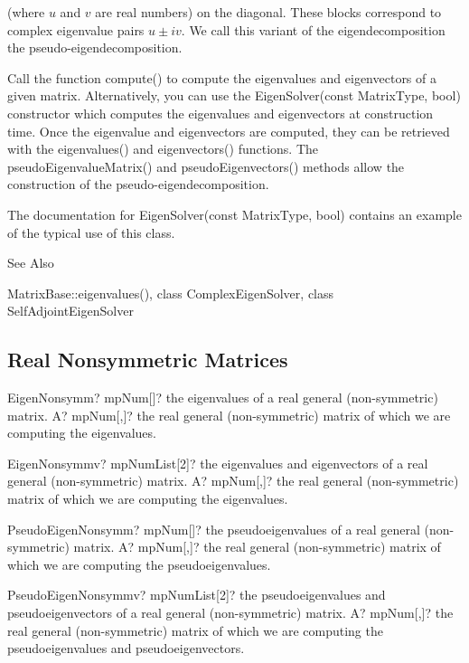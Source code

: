 (where $u$ and $v$ are real numbers) on the diagonal. These blocks correspond to complex eigenvalue pairs $u \pm iv$. We call this variant of the eigendecomposition the pseudo-eigendecomposition.

Call the function compute() to compute the eigenvalues and eigenvectors of a given matrix. Alternatively, you can use the EigenSolver(const MatrixType, bool) constructor which computes the eigenvalues and eigenvectors at construction time. Once the eigenvalue and eigenvectors are computed, they can be retrieved with the eigenvalues() and eigenvectors() functions. The pseudoEigenvalueMatrix() and pseudoEigenvectors() methods allow the construction of the pseudo-eigendecomposition.

The documentation for EigenSolver(const MatrixType, bool) contains an example of the typical use of this class.

See Also

MatrixBase::eigenvalues(), class ComplexEigenSolver, class SelfAdjointEigenSolver 


\subsection{Real Nonsymmetric Matrices}


\begin{mpFunctionsExtract}
	\mpFunctionOne
	{EigenNonsymm? mpNum[]? the eigenvalues of a real general (non-symmetric) matrix.}
	{A? mpNum[,]? the real general (non-symmetric) matrix of which we are computing the eigenvalues.}
\end{mpFunctionsExtract}

\vspace{0.6cm}
\begin{mpFunctionsExtract}
	\mpFunctionOne
	{EigenNonsymmv? mpNumList[2]? the eigenvalues and eigenvectors of a real general (non-symmetric) matrix.}
	{A? mpNum[,]? the real general (non-symmetric) matrix of which we are computing the eigenvalues.}
\end{mpFunctionsExtract}



\begin{mpFunctionsExtract}
	\mpFunctionOne
	{PseudoEigenNonsymm? mpNum[]? the pseudoeigenvalues of a real general (non-symmetric) matrix.}
	{A? mpNum[,]? the real general (non-symmetric) matrix of which we are computing the pseudoeigenvalues.}
\end{mpFunctionsExtract}

\vspace{0.6cm}
\begin{mpFunctionsExtract}
	\mpFunctionOne
	{PseudoEigenNonsymmv? mpNumList[2]? the pseudoeigenvalues and pseudoeigenvectors of a real general (non-symmetric) matrix.}
	{A? mpNum[,]? the real general (non-symmetric) matrix of which we are computing the pseudoeigenvalues and pseudoeigenvectors.}
\end{mpFunctionsExtract}


